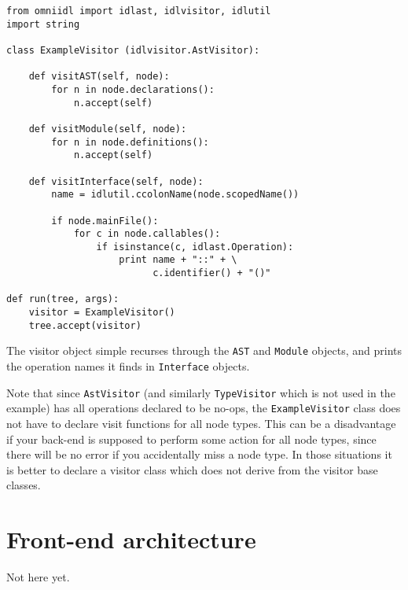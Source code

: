 \documentclass[11pt,twoside,a4paper]{article}
\newcommand{\class}[1]{\texttt{#1}}
\begin{document}
\begin{verbatim}
from omniidl import idlast, idlvisitor, idlutil
import string

class ExampleVisitor (idlvisitor.AstVisitor):

    def visitAST(self, node):
        for n in node.declarations():
            n.accept(self)

    def visitModule(self, node):
        for n in node.definitions():
            n.accept(self)

    def visitInterface(self, node):
        name = idlutil.ccolonName(node.scopedName())

        if node.mainFile():
            for c in node.callables():
                if isinstance(c, idlast.Operation):
                    print name + "::" + \
                          c.identifier() + "()"

def run(tree, args):
    visitor = ExampleVisitor()
    tree.accept(visitor)
\end{verbatim}

\noindent
The visitor object simple recurses through the \class{AST} and
\class{Module} objects, and prints the operation names it finds in
\class{Interface} objects.

Note that since \class{AstVisitor} (and similarly \class{TypeVisitor}
which is not used in the example) has all operations declared to be
no-ops, the \class{ExampleVisitor} class does not have to declare
visit functions for all node types. This can be a disadvantage if your
back-end is supposed to perform some action for all node types, since
there will be no error if you accidentally miss a node type. In those
situations it is better to declare a visitor class which does not
derive from the visitor base classes.



\section{Front-end architecture}

Not here yet.
\end{document}
